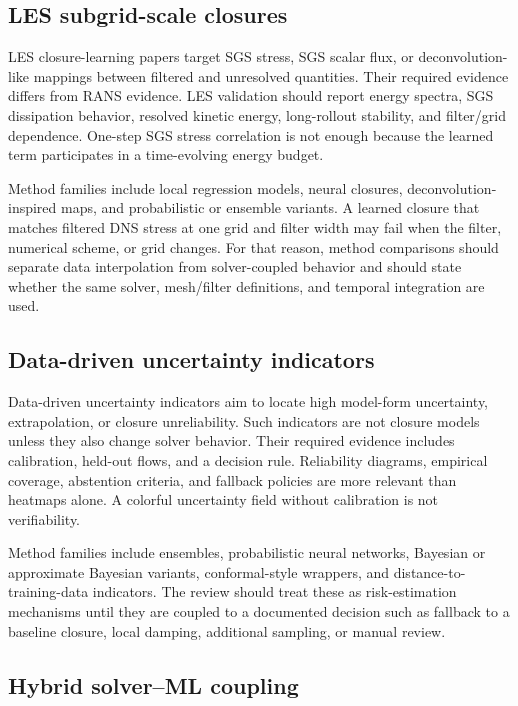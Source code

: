 \documentclass[11pt]{article}
\begin{document}
\subsection{LES subgrid-scale closures}

LES closure-learning papers target SGS stress, SGS scalar flux, or deconvolution-like mappings between filtered and unresolved quantities. Their required evidence differs from RANS evidence. LES validation should report energy spectra, SGS dissipation behavior, resolved kinetic energy, long-rollout stability, and filter/grid dependence. One-step SGS stress correlation is not enough because the learned term participates in a time-evolving energy budget.

Method families include local regression models, neural closures, deconvolution-inspired maps, and probabilistic or ensemble variants. A learned closure that matches filtered DNS stress at one grid and filter width may fail when the filter, numerical scheme, or grid changes. For that reason, method comparisons should separate data interpolation from solver-coupled behavior and should state whether the same solver, mesh/filter definitions, and temporal integration are used.

\subsection{Data-driven uncertainty indicators}

Data-driven uncertainty indicators aim to locate high model-form uncertainty, extrapolation, or closure unreliability. Such indicators are not closure models unless they also change solver behavior. Their required evidence includes calibration, held-out flows, and a decision rule. Reliability diagrams, empirical coverage, abstention criteria, and fallback policies are more relevant than heatmaps alone. A colorful uncertainty field without calibration is not verifiability.

Method families include ensembles, probabilistic neural networks, Bayesian or approximate Bayesian variants, conformal-style wrappers, and distance-to-training-data indicators. The review should treat these as risk-estimation mechanisms until they are coupled to a documented decision such as fallback to a baseline closure, local damping, additional sampling, or manual review.

\subsection{Hybrid solver--ML coupling}
\end{document}
